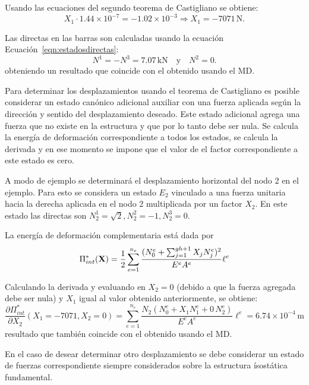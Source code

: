 Usando las ecuaciones del segundo teorema de Castigliano  se obtiene:
%
\begin{equation}
X_1 \cdot  1.44 \times 10^{-7} = -1.02 \times 10^{-3} \Rightarrow \boxed{ X_1 = -7071 \, \text{N} }.
\end{equation}

Las directas en las barras son calculadas usando la ecuación Ecuación~\eqref{eqn:estadosdirectas}:
%
\begin{equation}
N^1 = - N^3 =7.07 \, \text{kN} \quad \text{y} \quad N^2 = 0.
\end{equation}
obteniendo un resultado que coincide con el obtenido usando el MD.



Para determinar los desplazamientos usando el teorema de Castigliano es posible considerar un estado canónico adicional auxiliar con una fuerza aplicada según la dirección y sentido del desplazamiento deseado. %
%
Este estado adicional agrega una fuerza que no existe en la estructura y que por lo tanto debe ser nula. Se calcula la energía de deformación correspondiente a todos los estados, se calcula la derivada y en ese momento se impone que el valor de el factor correspondiente a este estado es cero.

A modo de ejemplo se determinará el desplazamiento horizontal del nodo 2 en el ejemplo. %
%
Para esto se considera un estado $E_2$ vinculado a una fuerza unitaria hacia la derecha aplicada en el nodo 2 multiplicada por un factor $X_2$. %
%
En este estado las directas son $N_2^1 = \sqrt{2}, N_2^2 = -1, N_2^3 = 0$.


La energía de deformación complementaria está dada por
%
\begin{equation}
\Pi_{int}^*({\bf X}) = \frac{1}{2}  \sum_{e=1}^{n_e} \frac{(N_0^e +   \sum_{j=1}^{gh+1}  X_j N_j^e)^2}{E^e A^e} \ell^e 
\end{equation}

Calculando la derivada y evaluando en $X_2=0$ (debido a que la fuerza agregada debe ser nula) y $X_1$ igual al valor obtenido anteriormente, se obtiene:
\begin{equation}
\frac{\partial \Pi_{int}^*}{\partial X_2} (X_1=-7071,X_2=0) =  \sum_{e=1}^{n_e} \frac{N_2 (N_0^e +  X_1 N_1^e + 0 \, N_2^e  )}{E^e A^e} \ell^e  = 6.74 \times 10^{-4} \, \text{m}
\end{equation}
resultado que también coincide con el obtenido usando el MD.


En el caso de desear determinar otro desplazamiento se debe considerar un estado de fuerzas correspondiente siempre considerados sobre la estructura ísostática fundamental.


